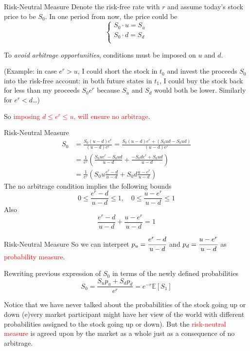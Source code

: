 \documentclass{beamer}
\begin{document}
\begin{frame}{Risk-Neutral Measure}
Denote the risk-free rate with $r$ and assume today's stock price to be $S_0$. In one period from now, the price could be 
\begin{equation*}
	\begin{cases}
		S_0\cdot u = S_u \\
		S_0\cdot d = S_d \\ 
	\end{cases}
\end{equation*}

To \emph{avoid arbitrage opportunities}, conditions must be imposed on $u$ and $d$. 

(Example: in case $e^r > u$, I could short the stock in $t_0$ and invest the proceeds $S_0$ into the risk-free account: in both future states in $t_1$, I could buy the stock back for less than my proceeds $S_0e^r$ because $S_u$ and $S_d$ would both be lower. Similarly for $e^r < d$\ldots)

So \textcolor{red}{imposing $d\le e^r \le u$, will ensure no arbitrage}.
\end{frame}


\begin{frame}{Risk-Neutral Measure}
\begin{equation*}
	\begin{aligned}
	S_0 &= \frac{S_0(u-d)e^r}{(u-d)e^r} = \frac{S_0(u-d)e^r + (S_0ud - S_0ud)}{(u-d)e^r}\\
	&= \frac{1}{e^r}\left(\frac{S_0ue^r - S_0ud}{u-d} + \frac{-S_0de^r + S_0ud}{u-d}\right) \\
	&= \frac{1}{e^r}\left(S_0u\frac{e^r - d}{u-d} + S_0d\frac{u - e^r}{u-d}\right)
	\end{aligned}
\end{equation*}
The no arbitrage condition implies the following bounds
\begin{equation*}
0\le\frac{e^r -d}{u-d}\le 1,\quad 0\le\frac{u - e^r}{u-d}\le 1
\end{equation*}
Also
\begin{equation*}
 \frac{e^r -d}{u-d} + \frac{u - e^r}{u-d} = 1
\end{equation*}
\end{frame}

\begin{frame}{Risk-Neutral Measure}
So we can interpret $p_u=\cfrac{e^r -d}{u-d}$ and $p_d=\cfrac{u - e^r}{u-d}$ as \textcolor{red}{probability measure}.\vspace{0.3cm}

Rewriting previous expression of $S_0$ in terms of the newly defined probabilities
\begin{equation*}
S_0 = \frac{S_up_u + S_dp_d}{e^r} = e^{-r}\mathbb{E}[S_1]
\end{equation*}

Notice that we have never talked about the probabilities of the stock going up or down (e)very market participant might have her view of the world with different probabilities assigned to the stock going up or down). 
But the \textcolor{red}{risk-neutral measure} is agreed upon by the market as a whole just as a consequence of no arbitrage.
\end{frame}
\end{document}
